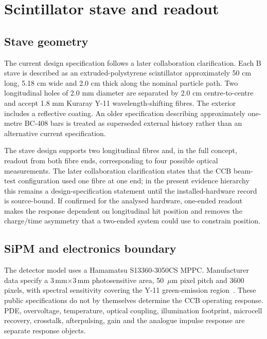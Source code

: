 \section{Scintillator stave and readout}

\subsection{Stave geometry}

The current design specification follows a later collaboration clarification. Each B stave is described as an extruded-polystyrene scintillator approximately 50 cm long, 5.18 cm wide and 2.0 cm thick along the nominal particle path. Two longitudinal holes of 2.0 mm diameter are separated by 2.0 cm centre-to-centre and accept 1.8 mm Kuraray Y-11 wavelength-shifting fibres. The exterior includes a reflective coating. An older specification describing approximately one-metre BC-408 bars is treated as superseded external history rather than an alternative current specification.

The stave design supports two longitudinal fibres and, in the full concept, readout from both fibre ends, corresponding to four possible optical measurements. The later collaboration clarification states that the CCB beam-test configuration used one fibre at one end; in the present evidence hierarchy this remains a design-specification statement until the installed-hardware record is source-bound. If confirmed for the analysed hardware, one-ended readout makes the response dependent on longitudinal hit position and removes the charge/time asymmetry that a two-ended system could use to constrain position.


\subsection{SiPM and electronics boundary}

The detector model uses a Hamamatsu S13360-3050CS MPPC. Manufacturer data specify a 3\,mm\(\times\)3\,mm photosensitive area, 50~\(\mu\)m pixel pitch and 3600 pixels, with spectral sensitivity covering the Y-11 green-emission region~\cite{HamamatsuS13360}. These public specifications do not by themselves determine the CCB operating response. PDE, overvoltage, temperature, optical coupling, illumination footprint, microcell recovery, crosstalk, afterpulsing, gain and the analogue impulse response are separate response objects.

